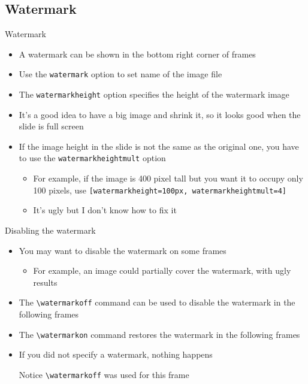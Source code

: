 \subsection{Watermark}
\begin{frame}[t,fragile]{Watermark}
\begin{itemize}
  \item A watermark can be shown in the bottom right corner of frames
  \item Use the \verb!watermark! option to set name of the image file
  \item The \verb!watermarkheight! option specifies the height of the watermark
      image
  \item It's a good idea to have a big image and shrink it, so it looks good
      when the slide is full screen
  \item If the image height in the slide is not the same as the original one,
      you have to use the \verb!watermarkheightmult! option
    \begin{itemize}
    \item For example, if the image is 400 pixel tall but you want it to
      occupy only 100 pixels, use
      \verb![watermarkheight=100px, watermarkheightmult=4]!
    \item It's ugly but I don't know how to fix it
    \end{itemize}
\end{itemize}
\end{frame}

\watermarkoff
\begin{frame}[t,fragile]{Disabling the watermark}
\begin{itemize}
  \item You may want to disable the watermark on some frames
    \begin{itemize}
      \item For example, an image could partially cover the watermark, with ugly
      results
    \end{itemize}
  \item The \verb!\watermarkoff! command can be used to disable the watermark
      in the following frames
  \item The \verb!\watermarkon! command restores the watermark in the following
      frames
  \item If you did not specify a watermark, nothing happens
  \begin{block}{Notice}
    \verb!\watermarkoff! was used for this frame
  \end{block}
\end{itemize}
\end{frame}
\watermarkon

